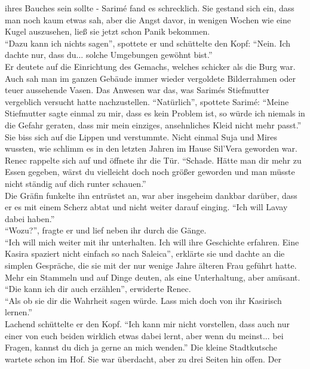 ihres Bauches sein sollte - Sarimé fand es schrecklich. Sie gestand sich ein, dass man noch kaum 
etwas sah, aber die Angst davor, in wenigen Wochen wie eine Kugel auszusehen, ließ sie jetzt schon 
Panik bekommen.\\
``Dazu kann ich nichts sagen'', spottete er und schüttelte den Kopf: ``Nein. Ich dachte nur, dass 
du... solche Umgebungen gewöhnt bist.''\\
Er deutete auf die Einrichtung des Gemachs, welches schicker als die Burg war. Auch sah man im 
ganzen Gebäude immer wieder vergoldete Bilderrahmen oder teuer aussehende Vasen. Das Anwesen war 
das, was Sarimés Stiefmutter vergeblich versucht hatte nachzustellen. ``Natürlich'', spottete 
Sarimé: ``Meine Stiefmutter sagte einmal zu mir, dass es kein Problem ist, so würde ich niemals in 
die Gefahr geraten, dass mir mein einziges, ansehnliches Kleid nicht mehr passt.''\\
Sie biss sich auf die Lippen und verstummte. Nicht einmal Suja und Mires wussten, wie schlimm es in 
den letzten Jahren im Hause Sil'Vera geworden war.\\
Renec rappelte sich auf und öffnete ihr die Tür. ``Schade. Hätte man dir mehr zu Essen gegeben, 
wärst du vielleicht doch noch größer geworden und man müsste nicht ständig auf dich runter 
schauen.''\\
Die Gräfin funkelte ihn entrüstet an, war aber insgeheim dankbar darüber, dass er es mit einem 
Scherz abtat und nicht weiter darauf einging. ``Ich will Lavay dabei haben.''\\
``Wozu?'', fragte er und lief neben ihr durch die Gänge.\\
``Ich will mich weiter mit ihr unterhalten. Ich will ihre Geschichte erfahren. Eine Kasira spaziert 
nicht einfach so nach Saleica'', erklärte sie und dachte an die simplen Gespräche, die sie mit der 
nur wenige Jahre älteren Frau geführt hatte. Mehr ein Stammeln und auf Dinge deuten, als eine 
Unterhaltung, aber amüsant.\\
``Die kann ich dir auch erzählen'', erwiderte Renec.\\
``Als ob sie dir die Wahrheit sagen würde. Lass mich doch von ihr Kasirisch lernen.''\\
Lachend schüttelte er den Kopf. ``Ich kann mir nicht vorstellen, dass auch nur einer von euch 
beiden wirklich etwas dabei lernt, aber wenn du meinst... bei Fragen, kannst du dich ja gerne an 
mich wenden.''
Die kleine Stadtkutsche wartete schon im Hof. Sie war überdacht, aber zu drei Seiten hin offen. Der 
